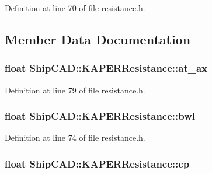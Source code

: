 Definition at line 70 of file resistance.\+h.



\subsection{Member Data Documentation}
\subsubsection[{\texorpdfstring{at\+\_\+ax}{at_ax}}]{\setlength{\rightskip}{0pt plus 5cm}float Ship\+C\+A\+D\+::\+K\+A\+P\+E\+R\+Resistance\+::at\+\_\+ax}\hypertarget{structShipCAD_1_1KAPERResistance_a803e780e97a79538c29af4a28c0afd51}{}\label{structShipCAD_1_1KAPERResistance_a803e780e97a79538c29af4a28c0afd51}


Definition at line 79 of file resistance.\+h.

\subsubsection[{\texorpdfstring{bwl}{bwl}}]{\setlength{\rightskip}{0pt plus 5cm}float Ship\+C\+A\+D\+::\+K\+A\+P\+E\+R\+Resistance\+::bwl}\hypertarget{structShipCAD_1_1KAPERResistance_ab1cc995ebce998cfc19ef8b1501f328e}{}\label{structShipCAD_1_1KAPERResistance_ab1cc995ebce998cfc19ef8b1501f328e}


Definition at line 74 of file resistance.\+h.

\subsubsection[{\texorpdfstring{cp}{cp}}]{\setlength{\rightskip}{0pt plus 5cm}float Ship\+C\+A\+D\+::\+K\+A\+P\+E\+R\+Resistance\+::cp}\hypertarget{structShipCAD_1_1KAPERResistance_a07797d6eb31e9a5506f7fca4b92d3f3a}{}\label{structShipCAD_1_1KAPERResistance_a07797d6eb31e9a5506f7fca4b92d3f3a}


